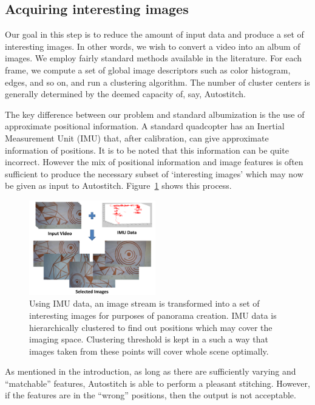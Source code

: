\documentclass[10pt,twocolumn,letterpaper]{article}
\begin{document}
\subsection{Acquiring interesting images}
Our goal in this step is to reduce the amount of input data and produce a
set of interesting images.  In other words, we wish to convert a video
into an album of images.  We employ fairly standard methods available
in the literature.  For each frame, we compute a set of global image
descriptors such as color histogram, edges, and so on, and run a
clustering algorithm.  The number of cluster centers is generally
determined by the deemed capacity of, say, Autostitch.

The key difference between our problem and standard albumization is
the use of approximate positional information.  A standard quadcopter
has an Inertial Measurement Unit (IMU) that, after calibration, can
give  approximate information of positions.  It is to be noted that
this information can be quite incorrect.  However the mix of
positional information and image features is often sufficient to
produce the necessary subset of `interesting images' which may now
be given as input to Autostitch. Figure~\ref{fig:selection} shows this
process. 

\begin{figure}[h!]
  \centering
  \includegraphics[width=0.49\textwidth]{figures/selection} 
  \caption{ \label{fig:selection}  Using IMU data, an image stream is
  transformed into a set of interesting images for purposes of panorama creation. IMU
    data is hierarchically clustered to find out positions which may cover the
    imaging space. Clustering threshold is kept in a such a way that images
    taken from these points will cover whole scene optimally.}
\end{figure}    


As mentioned in the introduction, as long as there are sufficiently
varying and ``matchable'' features, Autostitch is able to perform a
pleasant stitching.  However, if the features are in the ``wrong''
positions, then the output is not acceptable.
\end{document}
